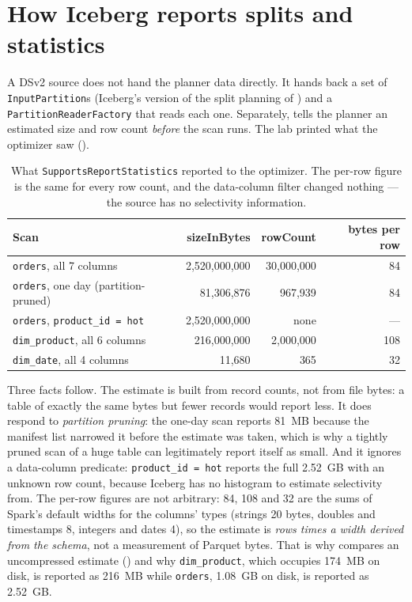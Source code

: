 \section{How Iceberg reports splits and statistics}
\label{sec:dsv2-splits-stats}

A DSv2 source does not hand the planner data directly. It hands back a set of
\texttt{InputPartition}s (Iceberg's version of the split planning of
) and a \texttt{PartitionReaderFactory} that reads each
one. Separately,  tells the planner an estimated
size and row count \emph{before} the scan runs. The lab printed what the
optimizer saw ().

\begin{table}[htbp]
\centering\footnotesize
\renewcommand{\arraystretch}{1.2}
\begin{tabular}{@{}P{5.3cm}rrr@{}}
\toprule
\textbf{Scan} & \textbf{sizeInBytes} & \textbf{rowCount} & \textbf{bytes per row} \\
\midrule
\texttt{orders}, all 7 columns & 2,520,000,000 & 30,000,000 & 84 \\
\texttt{orders}, one day (partition-pruned) & 81,306,876 & 967,939 & 84 \\
\texttt{orders}, \texttt{product\_id = hot} & 2,520,000,000 & none & --- \\
\texttt{dim\_product}, all 6 columns & 216,000,000 & 2,000,000 & 108 \\
\texttt{dim\_date}, all 4 columns & 11,680 & 365 & 32 \\
\bottomrule
\end{tabular}
\caption{What \texttt{SupportsReportStatistics} reported to the optimizer. The
per-row figure is the same for every row count, and the data-column filter changed
nothing --- the source has no selectivity information.}
\label{tab:dsv2-stats}
\end{table}

Three facts follow. The estimate is built from record counts, not from file bytes:
a table of exactly the same bytes but fewer records would report less. It does
respond to \emph{partition pruning}: the one-day scan reports 81~MB because the
manifest list narrowed it before the estimate was taken, which is why a
tightly pruned scan of a huge table can legitimately report itself as small. And it
ignores a data-column predicate: \texttt{product\_id = hot} reports the full 2.52~GB
with an unknown row count, because Iceberg has no histogram to estimate
selectivity from. The per-row figures are not arbitrary: 84, 108 and 32 are the sums
of Spark's default widths for the columns' types (strings 20 bytes, doubles and
timestamps 8, integers and dates 4), so the estimate is \emph{rows times a width
derived from the schema}, not a measurement of Parquet bytes. That is why
 compares an uncompressed estimate
() and why \texttt{dim\_product}, which occupies 174~MB on disk, is
reported as 216~MB while \texttt{orders}, 1.08~GB on disk, is reported as 2.52~GB.

